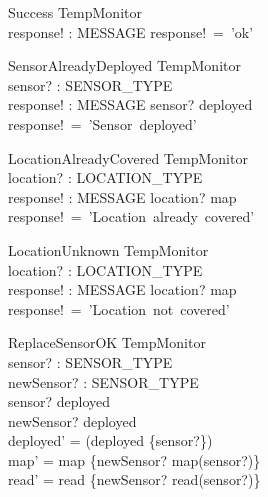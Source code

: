 \documentclass[12pt]{article}
\begin{document}
		
	
		\begin{schema}{Success}
			\Xi TempMonitor\\
			response! : MESSAGE
			\where
			response!~=~'ok'\\
		\end{schema}
		
		
		
		\begin{schema}{SensorAlreadyDeployed}
			\Xi TempMonitor\\
			sensor? : SENSOR\_TYPE\\
			response! : MESSAGE
			\where
			sensor? \in deployed\\
			response!~=~'Sensor~deployed'\\
		\end{schema}
		
		
		
		\begin{schema}{LocationAlreadyCovered}
			\Xi TempMonitor\\
			location? : LOCATION\_TYPE\\
			response! : MESSAGE
			\where
			location? \in \ran map\\
			response!~=~'Location~already~covered'
		\end{schema}
		
		
		
		\begin{schema}{LocationUnknown}
			\Xi TempMonitor\\
			location? : LOCATION\_TYPE\\
			response! : MESSAGE
			\where
			location? \notin \ran map\\
			response!~=~'Location~not~covered'
		\end{schema}
		
		
		
		\begin{schema}{ReplaceSensorOK}
			\Delta TempMonitor\\
			sensor? : SENSOR\_TYPE\\
			newSensor? : SENSOR\_TYPE\\
			\where
			sensor? \in deployed\\
			newSensor? \notin deployed\\
			deployed' = (deployed \setminus \{sensor?\}) \\
			map' = map \oplus \{newSensor? \mapsto map(sensor?)\}\\
			read' = read \oplus \{newSensor? \mapsto read(sensor?)\}\\
		\end{schema}
		
\end{document}
